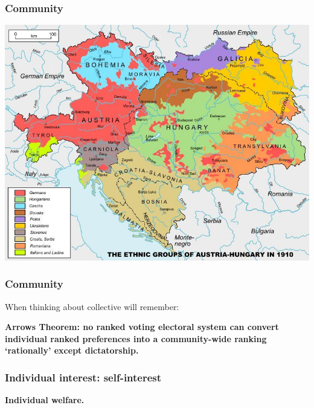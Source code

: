 \documentclass[aspectratio=169]{beamer}
\theoremstyle{principle}
\begin{document}
\begin{frame}
\frametitle{Community}
\begin{center}
\includegraphics[scale=0.33]{mapempire.jpg}
\end{center}

\end{frame}

\begin{frame}
\frametitle{Community}
When thinking about collective will remember:
\bigskip
\bigskip
\begin{center}
\large \textbf{Arrows Theorem: no ranked voting electoral system can convert individual ranked preferences into a community-wide ranking ‘rationally’ except dictatorship.}
\end{center}
\end{frame}

\begin{frame}
\frametitle{Individual interest: self-interest}
\begin{center}
\Huge \textbf{Individual welfare.}
\end{center}
\end{frame}
\end{document}
